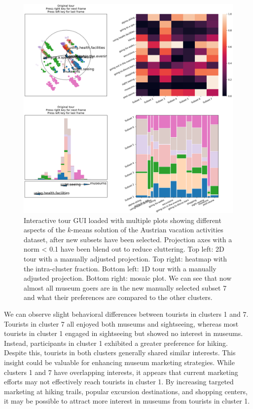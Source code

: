 \documentclass[article]{ajs}
\begin{document}
\begin{figure}[h!]
    \centering
    \includegraphics[width=1\textwidth]{winter_cl7_post.png}
    \caption{Interactive tour GUI loaded with multiple plots showing different aspects of the $k$-means solution of the Austrian vacation activities dataset, after new subsets have been selected. Projection axes with a norm < 0.1 have been blend out to reduce cluttering. Top left: 2D tour with a manually adjusted projection. Top right: heatmap with the intra-cluster fraction. Bottom left: 1D tour with a manually adjusted projection. Bottom right: mosaic plot. We can see that now almost all museum goers are in the new manually selected subset 7 and what their preferences are compared to the other clusters.}
    \label{fig:winter_cl7_post}
\end{figure}


We can observe slight behavioral differences between tourists in clusters 1 and 7. Tourists in cluster 7 all enjoyed both museums and sightseeing, whereas most tourists in cluster 1 engaged in sightseeing but showed no interest in museums. Instead, participants in cluster 1 exhibited a greater preference for hiking. Despite this, tourists in both clusters generally shared similar interests. This insight could be valuable for enhancing museum marketing strategies. While clusters 1 and 7 have overlapping interests, it appears that current marketing efforts may not effectively reach tourists in cluster 1. By increasing targeted marketing at hiking trails, popular excursion destinations, and shopping centers, it may be possible to attract more interest in museums from tourists in cluster 1.
\end{document}
